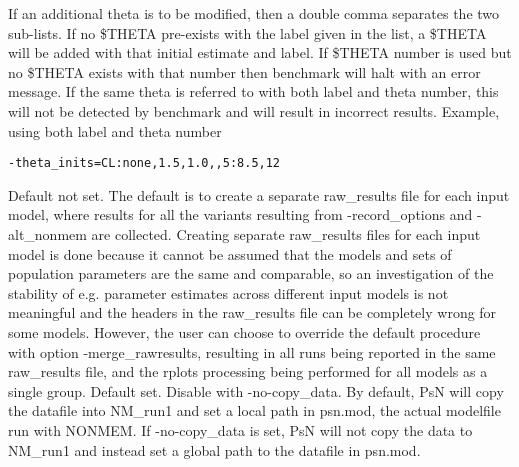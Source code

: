 \begin{optionlist}
If an additional theta is to be modified, then a double comma separates 
the two sub-lists. If no \$THETA pre-exists with the label given in the list,
a \$THETA will be added with that initial estimate and label. 
If \$THETA number is used but no \$THETA exists with that number then benchmark will halt with an
error message.
If the same theta is referred to with both label and theta number, this will not be detected
by benchmark and will result in incorrect results.
Example, using both label and theta number
\begin{verbatim}
-theta_inits=CL:none,1.5,1.0,,5:8.5,12
\end{verbatim}
\nextopt
{}
Default not set. The default is to create a separate raw\_results file for each input model,
where results for all the variants resulting from -record\_options and -alt\_nonmem
are collected. Creating separate raw\_results files for each input model is done because
it cannot be assumed that the models and sets of population parameters are the same and comparable,
so an investigation of the stability of e.g. parameter estimates across different input models
is not meaningful and the headers in the raw\_results file can be completely wrong for some models. 
However, the user can choose to override the default procedure
with option -merge\_rawresults, resulting in all runs being reported in the same raw\_results file,
and the rplots processing being performed for all models as a single group.
\nextopt
{}
Default set. Disable with -no-copy\_data. By default, PsN will copy the datafile into NM\_run1 and set a local path in psn.mod, the actual modelfile run with NONMEM. If -no-copy\_data is set, PsN will not copy the data to NM\_run1 and instead set a global path to the datafile in psn.mod.
\nextopt
\end{optionlist}


